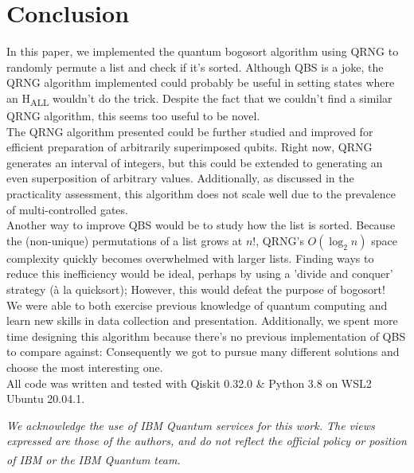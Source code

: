 \documentclass[12pt]{article}
\begin{document}
\section{Conclusion}
In this paper, we implemented the quantum bogosort algorithm using QRNG to randomly permute a list and check if it's sorted. Although QBS is a joke, the QRNG algorithm implemented could probably be useful in setting states where an H\textsubscript{ALL} wouldn't do the trick. Despite the fact that we couldn't find a similar QRNG algorithm, this seems too useful to be novel. \\
The QRNG algorithm presented could be further studied and improved for efficient preparation of arbitrarily superimposed qubits. Right now, QRNG generates an interval of integers, but this could be extended to generating an even superposition of arbitrary values. Additionally, as discussed in the practicality assessment, this algorithm does not scale well due to the prevalence of multi-controlled gates. \\
Another way to improve QBS would be to study how the list is sorted. Because the (non-unique) permutations of a list grows at $n!$, QRNG's $O(\log_2 n)$ space complexity quickly becomes overwhelmed with larger lists. Finding ways to reduce this inefficiency would be ideal, perhaps by using a 'divide and conquer' strategy (\`{a} la quicksort); However, this would defeat the purpose of bogosort! \\
We were able to both exercise previous knowledge of quantum computing and learn new skills in data collection and presentation. Additionally, we spent more time designing this algorithm because there's no previous implementation of QBS to compare against: Consequently we got to pursue many different solutions and choose the most interesting one. \\

\vspace{10mm}
\noindent All code was written and tested with Qiskit 0.32.0 \& Python 3.8 on WSL2 Ubuntu 20.04.1.

\vspace{15mm}
\noindent \emph{We acknowledge the use of IBM Quantum services for this work. The views expressed are those of the authors, and do not reflect the official policy or position of IBM or the IBM Quantum team.\textsuperscript{\cite{ibm_21}}}


\nocite{*}

\end{document}
